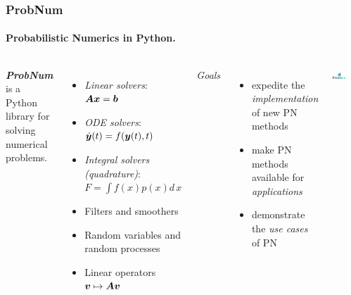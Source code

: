 \documentclass[10pt,usepdftitle=false,aspectratio=169]{beamer}
\begin{document}
\begin{frame}\frametitle{ProbNum}
	\framesubtitle{Probabilistic Numerics in Python.}

	\begin{columns}

		\emph{\bf ProbNum} is a Python library for solving numerical problems.

		{\small
		\begin{itemize}
			\item \emph{Linear solvers}: $\mA \vx = \vb$ 
			\item \emph{ODE solvers}: $\dot{\vy}(t) = f(\vy(t), t)$
			\item \emph{Integral solvers (quadrature)}: $F= \int f(x) p(x) d\, x$
			\item Filters and smoothers
			\item Random variables and random processes
			\item Linear operators $\vv \mapsto \mA \vv$
		\end{itemize}
		}

		\emph{Goals}
		\begin{itemize}
			\item expedite the \textit{implementation} of new PN methods
			\item make PN methods available for \textit{applications}
			\item demonstrate the \textit{use cases} of PN
		\end{itemize}


		{
		\centering

		\href{https://github.com/probabilistic-numerics/probnum/}{\includegraphics[scale=0.35]{figures/probnum_logo_text.png}}
		}

		\vspace{0.5em}

		\begin{center}
			\begin{tikzpicture}[yscale=.5]


\end{tikzpicture}
\end{center}
\end{columns}
\end{frame}
\end{document}
